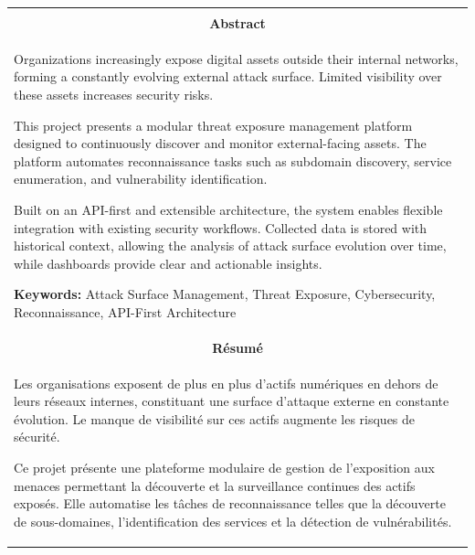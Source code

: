 \documentclass[a4paper,12pt]{report}
\begin{document}
\nocite{*}
\printbibliography




\cleardoublepage
{}

\thispagestyle{empty}

\vspace*{\fill}

\noindent
\begin{tabular}{|p{}|}
\hline
\\[0.6em]
\multicolumn{1}{|c|}{\textbf{\large Abstract}} \\[0.5em]
Organizations increasingly expose digital assets outside their internal networks, forming a constantly evolving external attack surface. Limited visibility over these assets increases security risks.

\vspace{0.5em}
This project presents a modular threat exposure management platform designed to continuously discover and monitor external-facing assets. The platform automates reconnaissance tasks such as subdomain discovery, service enumeration, and vulnerability identification.

\vspace{0.5em}
Built on an API-first and extensible architecture, the system enables flexible integration with existing security workflows. Collected data is stored with historical context, allowing the analysis of attack surface evolution over time, while dashboards provide clear and actionable insights.

\vspace{0.5em}
\textbf{Keywords:} Attack Surface Management, Threat Exposure, Cybersecurity, Reconnaissance, API-First Architecture
\hline
\\[0.6em]
\multicolumn{1}{|c|}{\textbf{\large Résumé}} \\[0.5em]
Les organisations exposent de plus en plus d'actifs numériques en dehors de leurs réseaux internes, constituant une surface d'attaque externe en constante évolution. Le manque de visibilité sur ces actifs augmente les risques de sécurité.

\vspace{0.5em}
Ce projet présente une plateforme modulaire de gestion de l'exposition aux menaces permettant la découverte et la surveillance continues des actifs exposés. Elle automatise les tâches de reconnaissance telles que la découverte de sous-domaines, l'identification des services et la détection de vulnérabilités.


\end{tabular}
\end{document}

